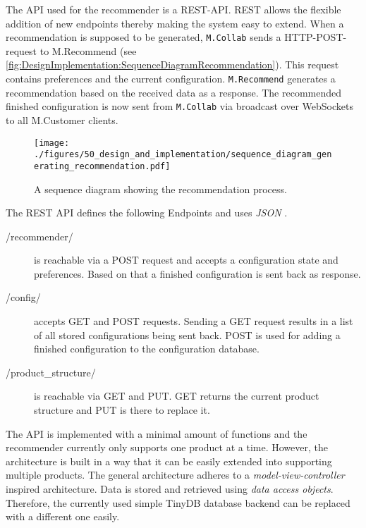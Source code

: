 The API used for the recommender is a REST-API. REST allows the flexible addition of new endpoints thereby making the system easy to extend.
When a recommendation is supposed to be generated, \texttt{M.Collab} sends a HTTP-POST-request to M.Recommend (see \autoref{fig:DesignImplementation:SequenceDiagramRecommendation}). This request contains preferences and the current configuration. \texttt{M.Recommend} generates a recommendation based on the received data as a response. The recommended finished configuration is now sent from  \texttt{M.Collab} via broadcast over WebSockets to all M.Customer clients. 

\begin{figure}[b]
    \centering
    \texttt{[image: ./figures/50\_design\_and\_implementation/sequence\_diagram\_generating\_recommendation.pdf]}
    \caption[Sequence Diagram: Recommendation Generation]{A sequence diagram showing the recommendation process.}
    \label{fig:DesignImplementation:SequenceDiagramRecommendation}
\end{figure}

The REST API defines the following Endpoints and uses \emph{JSON} \cite{IntroducingJSON}.

\begin{description}
    \item[/recommender/] is reachable via a POST request and accepts a configuration state and preferences. Based on that a finished configuration is sent back as response.
    \item[/config/] accepts GET and POST requests. Sending a GET request results in a list of all stored configurations being sent back. POST is used for adding a finished configuration to the configuration database.
    \item[/product\_structure/] is reachable via GET and PUT. GET returns the current product structure and PUT is there to replace it.
\end{description}

The API is implemented with a minimal amount of functions and the recommender currently only supports one product at a time. However, the architecture is built in a way that it can be easily extended into supporting multiple products.
The general architecture adheres to a \emph{model-view-controller} \cite{gamma2015design} inspired architecture.
Data is stored and retrieved using \emph{data access objects}. Therefore, the currently used simple TinyDB database backend can be replaced with a different one easily.

